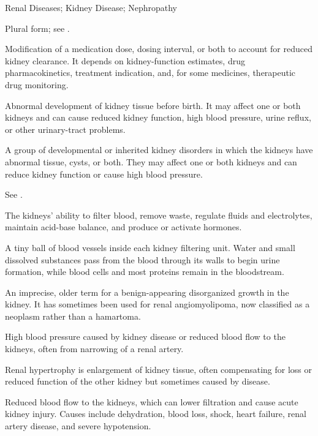 \synonyms
Renal Diseases; Kidney Disease; Nephropathy

 Plural form; see .

 Modification of a medication dose, dosing interval, or both to account for reduced
kidney clearance. It depends on kidney-function estimates, drug pharmacokinetics,
treatment indication, and, for some medicines, therapeutic drug monitoring.

 Abnormal development of kidney tissue before birth. It may affect one or both kidneys and can cause reduced kidney function, high blood pressure, urine reflux, or other urinary-tract problems.

 A group of developmental or inherited kidney disorders in which the kidneys have abnormal tissue, cysts, or both. They may affect one or both kidneys and can reduce kidney function or cause high blood pressure.

 See .

 The kidneys’ ability to filter blood, remove waste, regulate fluids and electrolytes, maintain acid-base balance, and produce or activate hormones.

 A tiny ball of blood vessels inside each kidney filtering unit. Water and small dissolved substances pass from the blood through its walls to begin urine formation, while blood cells and most proteins remain in the bloodstream.

 An imprecise, older term for a benign-appearing disorganized growth in the kidney. It has sometimes been used for renal angiomyolipoma, now classified as a neoplasm rather than a hamartoma.

 High blood pressure caused by kidney disease or reduced blood flow to the kidneys, often from narrowing of a renal artery.

 Renal hypertrophy is enlargement of kidney tissue, often compensating for loss or reduced function of the other kidney but sometimes caused by disease.

 Reduced blood flow to the kidneys, which can lower filtration and cause acute kidney injury. Causes include dehydration, blood loss, shock, heart failure, renal artery disease, and severe hypotension.

